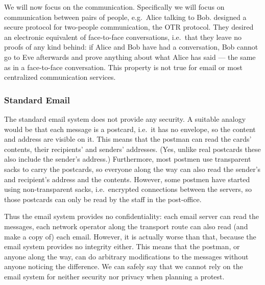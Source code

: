 We will now focus on the communication.
Specifically we will focus on communication between pairs of people, e.g.\ 
Alice talking to Bob.
\citeauthor{otr2004} designed a secure protocol for two-people communication, 
the \ac{OTR} protocol.
They desired an electronic equivalent of face-to-face conversations, i.e.\ that 
they leave no proofs of any kind behind:
if Alice and Bob have had a conversation, Bob cannot go to Eve afterwards and 
prove anything about what Alice has said --- the same as in a face-to-face 
conversation.
This property is not true for email or most centralized communication
services.

\subsubsection{Standard Email}

The standard email system does not provide any security.
A suitable analogy would be that each message is a postcard, i.e.\ it has no 
envelope, so the content and address are visible on it.
This means that the postman can read the cards' contents, their recipients' and
senders' addresses.
(Yes, unlike real postcards these also include the sender's address.)
Furthermore, most postmen use transparent sacks to carry the postcards, so 
everyone along the way can also read the sender's and recipient's address and 
the contents.
However, some postmen have started using non-transparent sacks, i.e.\ encrypted 
connections between the servers, so those postcards can only be read by the 
staff in the post-office. %

Thus the email system provides no confidentiality: each email server can read 
the messages, each network operator along the transport route can also read 
(and make a copy of) each email.
However, it is actually worse than that, because the email system provides no 
integrity either.
This means that the postman, or anyone along the way, can do arbitrary 
modifications to the messages without anyone noticing the difference.
We can safely say that we cannot rely on the email system for neither security 
nor privacy when planning a protest.

